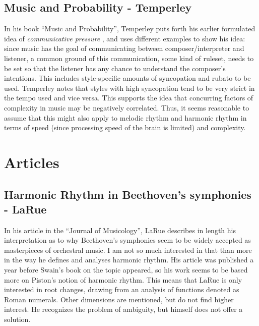 \documentclass[a4paper,12pt]{report}
\begin{document}
\section{Music and Probability - Temperley}
\cite{temperley2007music}
In his book ``Music and Probability'', Temperley puts forth his earlier formulated idea of \emph{
communicative pressure} \cite{temperley2004communicative}, and uses different examples to show his
idea: since music has the goal of communicating between composer/interpreter and listener, a common
ground of this communication, some kind of ruleset, needs to be set so that the listener has any chance
to understand the composer's intentions. This includes style-specific amounts of syncopation and rubato
to be used. Temperley notes that styles with high syncopation tend to be very strict in the tempo used and
vice versa. This supports the idea that concurring factors of complexity in music may be negatively
correlated. Thus, it seems reasonable to assume that this might also apply to melodic rhythm and
harmonic rhythm in terms of speed (since processing speed of the brain is limited) and complexity.

\chapter{Articles}

\section{Harmonic Rhythm in Beethoven's symphonies - LaRue}
\cite{la2001harmonic}
In his article in the ``Journal of Musicology'', LaRue describes in length his interpretation as to why
Beethoven's symphonies seem to be widely accepted as masterpieces of orchestral music. I am not so
much interested in that than more in the way he defines and analyses harmonic rhythm. His article was
published a year before Swain's book on the topic appeared, so his work seems to be based more on
Piston's notion of harmonic rhythm. This means that LaRue is only interested in root changes, drawing
from an analysis of functions denoted as Roman numerals. Other dimensions are mentioned, but do not
find higher interest. He recognizes the problem of ambiguity, but himself does not offer a solution.
\end{document}
